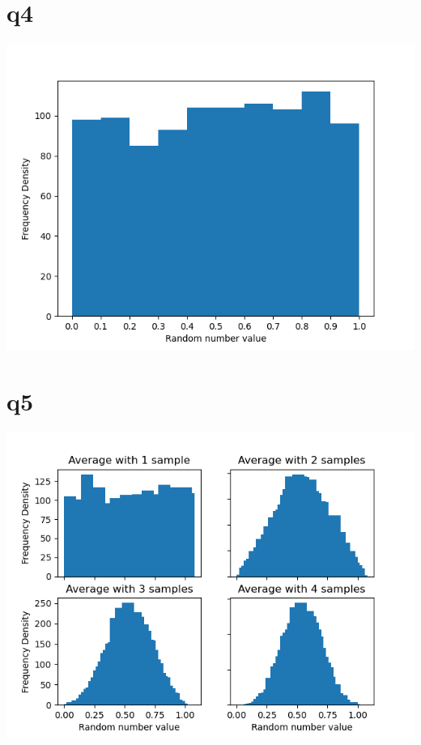 \documentclass[a4paper,english]{article}
\begin{document}
    \section{q4}
        
        
        \includegraphics[scale=0.8]{q5_4.png}
        \\
    \section{q5}
        
        
        \includegraphics[scale=0.8]{q5_5.png}
        \\
\end{document}
